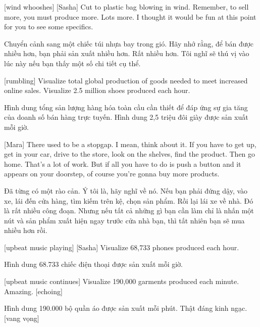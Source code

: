 \documentclass[a4paper]{article}
\begin{document}
	[wind whooshes]
	[Sasha] Cut to plastic bag blowing in wind.
	Remember, to sell more, you must produce more.
	Lots more.
	I thought it would be fun at this point for you to see some specifics.
	
	\begin{vietnamese-v2}
		 Chuyển cảnh sang một chiếc túi nhựa bay trong gió. 
		Hãy nhớ rằng, để bán được nhiều hơn, bạn phải sản xuất nhiều hơn. 
		Rất nhiều hơn. 
		Tôi nghĩ sẽ thú vị vào lúc này nếu bạn thấy một số chi tiết cụ thể.
	\end{vietnamese-v2}
	
	[rumbling]
	Visualize total global production of goods needed to meet increased online sales.
	Visualize 2.5 million shoes produced each hour.
	
	\begin{vietnamese-v2}
		[tiếng ầm ầm] 
		Hình dung tổng sản lượng hàng hóa toàn cầu cần thiết để đáp ứng sự gia tăng của doanh số bán hàng trực tuyến. 
		Hình dung 2,5 triệu đôi giày được sản xuất mỗi giờ.
	\end{vietnamese-v2}
	
	[Mara] There used to be a stopgap. I mean, think about it.
	If you have to get up, get in your car, drive to the store, look on the shelves, find the product.
	Then go home.
	That's a lot of work.
	But if all you have to do is push a button and it appears on your doorstep, of course you're gonna buy more products.
	
	\begin{vietnamese-v2}
		[Mara] Đã từng có một rào cản. Ý tôi là, hãy nghĩ về nó. 
		Nếu bạn phải đứng dậy, vào xe, lái đến cửa hàng, tìm kiếm trên kệ, chọn sản phẩm. 
		Rồi lại lái xe về nhà. Đó là rất nhiều công đoạn. 
		Nhưng nếu tất cả những gì bạn cần làm chỉ là nhấn một nút và sản phẩm xuất hiện ngay trước cửa nhà bạn, thì tất nhiên bạn sẽ mua nhiều hơn rồi.
	\end{vietnamese-v2}
	
	[upbeat music playing]
	[Sasha] Visualize 68,733 phones produced each hour.
	
	\begin{vietnamese-v2}
		 Hình dung 68.733 chiếc điện thoại được sản xuất mỗi giờ.
	\end{vietnamese-v2}
	
	[upbeat music continues]
	Visualize 190,000 garments produced each minute.
	Amazing. [echoing]
	
	\begin{vietnamese-v2}
		Hình dung 190.000 bộ quần áo được sản xuất mỗi phút. 
		Thật đáng kinh ngạc. [vang vọng]
	\end{vietnamese-v2}
	
\end{document}
